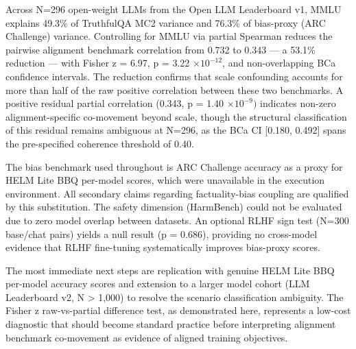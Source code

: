 
Across N=296 open-weight LLMs from the Open LLM Leaderboard v1, MMLU explains 49.3\% of TruthfulQA MC2 variance and 76.3\% of bias-proxy (ARC Challenge) variance. Controlling for MMLU via partial Spearman reduces the pairwise alignment benchmark correlation from 0.732 to 0.343 --- a 53.1\% reduction --- with Fisher z = 6.97, p = 3.22 $\times 10^{-12}$, and non-overlapping BCa confidence intervals. The reduction confirms that scale confounding accounts for more than half of the raw positive correlation between these two benchmarks. A positive residual partial correlation (0.343, p = 1.40 $\times 10^{-9})$ indicates non-zero alignment-specific co-movement beyond scale, though the structural classification of this residual remains ambiguous at N=296, as the BCa CI [0.180, 0.492] spans the pre-specified coherence threshold of 0.40.

The bias benchmark used throughout is ARC Challenge accuracy as a proxy for HELM Lite BBQ per-model scores, which were unavailable in the execution environment. All secondary claims regarding factuality-bias coupling are qualified by this substitution. The safety dimension (HarmBench) could not be evaluated due to zero model overlap between datasets. An optional RLHF sign test (N=300 base/chat pairs) yields a null result (p = 0.686), providing no cross-model evidence that RLHF fine-tuning systematically improves bias-proxy scores.

The most immediate next steps are replication with genuine HELM Lite BBQ per-model accuracy scores and extension to a larger model cohort (LLM Leaderboard v2, N > 1,000) to resolve the scenario classification ambiguity. The Fisher z raw-vs-partial difference test, as demonstrated here, represents a low-cost diagnostic that should become standard practice before interpreting alignment benchmark co-movement as evidence of aligned training objectives.

